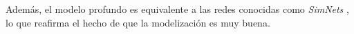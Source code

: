 Además, el modelo profundo es equivalente a las redes conocidas como \textit{SimNets} \cite{matematicas:principal}, lo que reafirma el hecho de que la modelización es muy buena.

